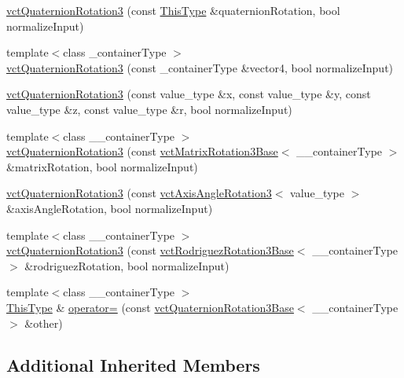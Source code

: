 \begin{DoxyCompactItemize}
\item 
\hyperlink{classvct_quaternion_rotation3_a2e3fe8a00490f42d6e74691e4f5139bd}{vct\+Quaternion\+Rotation3} (const \hyperlink{classvct_fixed_size_const_vector_base_a071063bc4fa43112cc287b2dbef53180}{This\+Type} \&quaternion\+Rotation, bool normalize\+Input)
\item 
{\footnotesize template$<$class \+\_\+container\+Type $>$ }\\\hyperlink{classvct_quaternion_rotation3_a7c5350f623b29acbc9078db984b8319d}{vct\+Quaternion\+Rotation3} (const \+\_\+container\+Type \&vector4, bool normalize\+Input)
\item 
\hyperlink{classvct_quaternion_rotation3_afd576b5562dd20b964669d560225a9d9}{vct\+Quaternion\+Rotation3} (const value\+\_\+type \&x, const value\+\_\+type \&y, const value\+\_\+type \&z, const value\+\_\+type \&r, bool normalize\+Input)
\item 
{\footnotesize template$<$class \+\_\+\+\_\+container\+Type $>$ }\\\hyperlink{classvct_quaternion_rotation3_a69bf1c8baea4d6a0cb9f044f6dd0957d}{vct\+Quaternion\+Rotation3} (const \hyperlink{classvct_matrix_rotation3_base}{vct\+Matrix\+Rotation3\+Base}$<$ \+\_\+\+\_\+container\+Type $>$ \&matrix\+Rotation, bool normalize\+Input)
\item 
\hyperlink{classvct_quaternion_rotation3_ad44748cd63f2d942d16631b521f00405}{vct\+Quaternion\+Rotation3} (const \hyperlink{classvct_axis_angle_rotation3}{vct\+Axis\+Angle\+Rotation3}$<$ value\+\_\+type $>$ \&axis\+Angle\+Rotation, bool normalize\+Input)
\item 
{\footnotesize template$<$class \+\_\+\+\_\+container\+Type $>$ }\\\hyperlink{classvct_quaternion_rotation3_a45571b22ed4aafd2c007220ff4d29916}{vct\+Quaternion\+Rotation3} (const \hyperlink{classvct_rodriguez_rotation3_base}{vct\+Rodriguez\+Rotation3\+Base}$<$ \+\_\+\+\_\+container\+Type $>$ \&rodriguez\+Rotation, bool normalize\+Input)
\item 
{\footnotesize template$<$class \+\_\+\+\_\+container\+Type $>$ }\\\hyperlink{classvct_fixed_size_const_vector_base_a071063bc4fa43112cc287b2dbef53180}{This\+Type} \& \hyperlink{classvct_quaternion_rotation3_a62f9e5b04da4936936ca38335ea17f92}{operator=} (const \hyperlink{classvct_quaternion_rotation3_base}{vct\+Quaternion\+Rotation3\+Base}$<$ \+\_\+\+\_\+container\+Type $>$ \&other)
\end{DoxyCompactItemize}
\subsection*{Additional Inherited Members}


